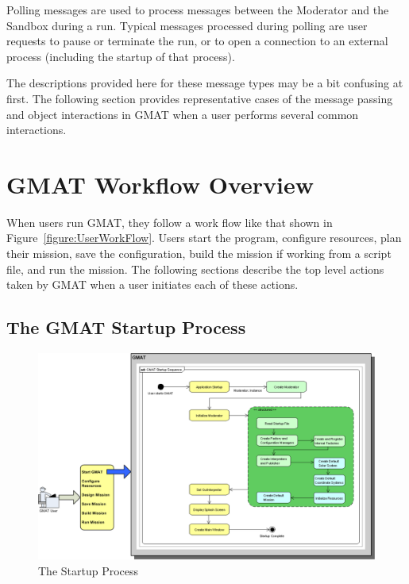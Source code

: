 Polling messages are used to process messages between the Moderator and the Sandbox during a run.
Typical messages processed during polling are user requests to pause or terminate the run, or to
open a connection to an external process (including the startup of that process).

The descriptions provided here for these message types may be a bit confusing at first.  The
following section provides representative cases of the message passing and object interactions in
GMAT when a user performs several common interactions.

\section{\label{section:TopLevelUseCase}GMAT Workflow Overview}

When users run GMAT, they follow a work flow like that shown in Figure~\ref{figure:UserWorkFlow}.
Users start the program, configure resources, plan their mission, save the configuration, build the
mission if working from a script file, and run the mission.  The following sections describe the top
level actions taken by GMAT when a user initiates each of these actions.

\subsection{\label{section:GMATStartup}The GMAT Startup Process}

\begin{figure}[htb]
\begin{center}
\includegraphics[450,277]{Images/GMAT_Startup.png}
\caption{\label{figure:StartupActivities}The Startup Process}
\end{center}
\end{figure}

